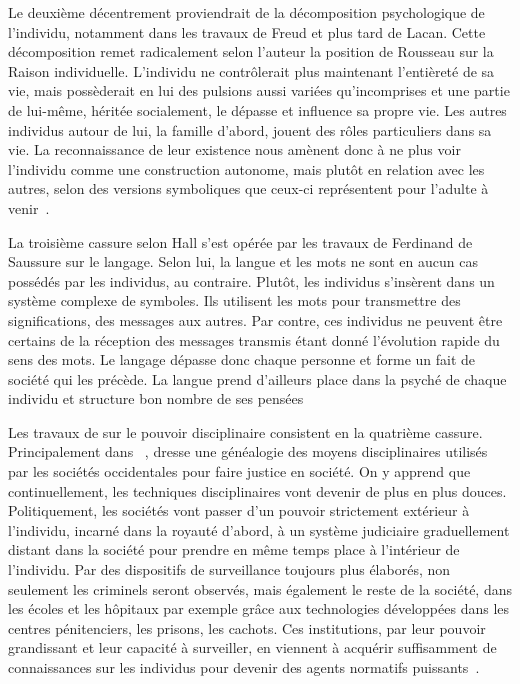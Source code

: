 Le deuxième décentrement proviendrait de la décomposition psychologique de l'individu, notamment dans les travaux de Freud et plus tard de Lacan.
Cette décomposition remet radicalement selon l'auteur la position de Rousseau sur la Raison individuelle.
L'individu ne contrôlerait plus maintenant l'entièreté de sa vie, mais possèderait en lui des pulsions aussi variées qu'incomprises et une partie de lui-même, héritée socialement, le dépasse et influence sa propre vie.
Les autres individus autour de lui, la famille d'abord, jouent des rôles particuliers dans sa vie.
La reconnaissance de leur existence nous amènent donc à ne plus voir l'individu comme une construction autonome, mais plutôt en relation avec les autres, selon des versions symboliques que ceux-ci représentent pour l'adulte à venir~\citeyearpar[ 607--608]{Hall1996a}.

La troisième cassure selon Hall s'est opérée par les travaux de Ferdinand de Saussure sur le langage.
Selon lui, la langue et les mots ne sont en aucun cas possédés par les individus, au contraire.
Plutôt, les individus s'insèrent dans un système complexe de symboles.
Ils utilisent les mots pour transmettre des significations, des messages aux autres.
Par contre, ces individus ne peuvent être certains de la réception des messages transmis étant donné l'évolution rapide du sens des mots.
Le langage dépasse donc chaque personne et forme un fait de société qui les précède.
La langue prend d'ailleurs place dans la psyché de chaque individu et structure bon nombre de ses pensées~\citeyearpar[608--609]{Hall1996a}

Les travaux de \citeauthor{Foucault2004a} sur le pouvoir disciplinaire consistent en la quatrième cassure.
Principalement dans ~\citeyearpar{Foucault2004a}, \citeauthor{Foucault2004a} dresse une généalogie des moyens disciplinaires utilisés par les sociétés occidentales pour faire justice en société.
On y apprend que continuellement, les techniques disciplinaires vont devenir de plus en plus douces.
Politiquement, les sociétés vont passer d'un pouvoir strictement extérieur à l'individu, incarné dans la royauté d'abord, à un système judiciaire graduellement distant dans la société pour prendre en même temps place à l'intérieur de l'individu.
Par des dispositifs de surveillance toujours plus élaborés, non seulement les criminels seront observés, mais également le reste de la société, dans les écoles et les hôpitaux par exemple grâce aux technologies développées dans les centres pénitenciers, les prisons, les cachots.
Ces institutions, par leur pouvoir grandissant et leur capacité à surveiller, en viennent à acquérir suffisamment de connaissances sur les individus pour devenir des agents normatifs puissants~\citep[608--609]{Hall1996a}.

